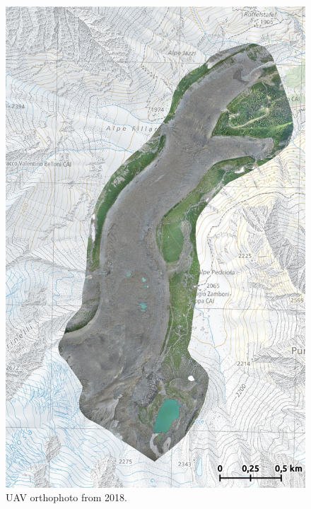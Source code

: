 \begin{figure}[p]
    \centering
    \includegraphics[height=\textheight]{figures/appendix/orto_2018.jpg}
    \caption[]{UAV orthophoto from 2018.}
\end{figure}

